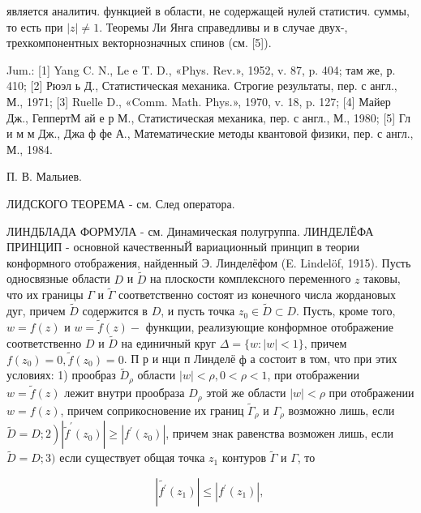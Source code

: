 \documentclass[10pt]{article}
\begin{document}
является аналитич. функцией в области, не содержащей нулей статистич. суммы, то есть при $|z| \neq 1$. Теоремы Ли Янга справедливы и в случае двух-, трехкомпонентных векторнозначных спинов (см. [5]).



Jum.: [1] Yang C. N., Le e T. D., «Phys. Rev.», 1952, v. 87, p. 404; там же, р. 410; [2] Рюэл ь Д., Статистическая механика. Строгие результаты, пер. с англ., М., 1971; [3] Ruelle D., «Comm. Math. Phys.», 1970, v. 18, p. 127; [4] Майер Дж., ГеппертМ ай е р М., Статистическая механика, пер. с англ., М., 1980; [5] Гл и м м Дж., Джа ф фе А., Математические методы квантовой физики, пер. с англ., М., 1984.



П. В. Мальиев.



ЛИДСКОГО ТЕОРЕМА - см. След оператора.



ЛИНДБЛАДА ФОРМУЛА - см. Динамическая полугруппа. ЛИНДЕЛЁФА ПРИНЦИП - основной качественныЙ вариационный принцип в теории конформного отображения, найденный Э. Линделёфом (E. Lindelöf, 1915). Пусть односвязные области $D$ и $\widetilde{D}$ на плоскости комплексного переменного $z$ таковы, что их границы $\Gamma$ и $\widetilde{\Gamma}$ соответственно состоят из конечного числа жордановых дуг, причем $\tilde{D}$ содержится в $D$, и пусть точка $z_{0} \in \widetilde{D} \subset D$. Пусть, кроме того, $w=f(z)$ и $w=\tilde{f}(z)-$ функщии, реализующие конформное отображение соответственно $D$ и $\widetilde{D}$ на единичный круг $\Delta=\{w:|w|<1\}$, причем $f\left(z_{0}\right)=0, \tilde{f}\left(z_{0}\right)=0$. П р и нци п Линделё $ф$ а состоит в том, что при этих условиях: 1) прообраз $\widetilde{D}_{\rho}$ области $|w|<\rho, 0<\rho<1$, при отображении $w=\tilde{f}(z)$ лежит внутри прообраза $D_{\rho}$ этой же области $|w|<\rho$ при отображении $w=f(z)$, причем соприкосновение их границ $\widetilde{\Gamma}_{\rho}$ и $\Gamma_{\rho}$ возможно лишь, если $\left.\widetilde{D}=D ; 2\right)\left|\widetilde{f}^{\prime}\left(z_{0}\right)\right| \geqslant\left|f^{\prime}\left(z_{0}\right)\right|$, причем знак равенства возможен лишь, если $\widetilde{D}=D ; 3)$ если существует общая точка $z_{1}$ контуров $\widetilde{\Gamma}$ и $\Gamma$, то



\[

\left|\tilde{f^{\prime}}\left(z_{1}\right)\right| \leqslant\left|f^{\prime}\left(z_{1}\right)\right| \text {, }

\]
\end{document}
